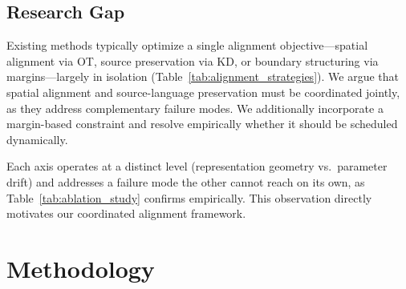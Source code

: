 \documentclass[11pt]{article}
\begin{document}
\subsection{Research Gap}
Existing methods typically optimize a single alignment objective—spatial alignment via OT, source preservation via KD, or boundary structuring via margins—largely in isolation (Table~\ref{tab:alignment_strategies}). We argue that spatial alignment and source-language preservation must be coordinated jointly, as they address complementary failure modes. We additionally incorporate a margin-based constraint and resolve empirically whether it should be scheduled dynamically.

\begin{table}[t]
\centering
\footnotesize
\setlength{\tabcolsep}{2pt}
\caption{Comparison of cross-lingual adaptation strategies. Our framework combines all three components. Section~\ref{sec:margin_impact} compares static and dynamic boundary regularization.}
\label{tab:alignment_strategies}
\end{table}

Each axis operates at a distinct level (representation geometry vs.\ parameter drift) and addresses a failure mode the other cannot reach on its own, as Table~\ref{tab:ablation_study} confirms empirically. This observation directly motivates our coordinated alignment framework.

\section{Methodology}
\end{document}
